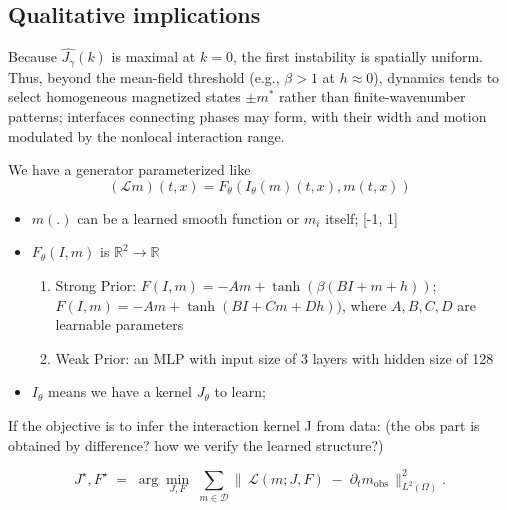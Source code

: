 \documentclass[11pt,a4paper]{article}
\begin{document}
\subsection{Qualitative implications}
Because $\widehat{J_\gamma}(k)$ is maximal at $k=0$, the first instability is spatially uniform. Thus, beyond the mean-field threshold (e.g., $\beta>1$ at $h\approx0$), dynamics tends to select homogeneous magnetized states $\pm m^*$ rather than finite-wavenumber patterns; interfaces connecting phases may form, with their width and motion modulated by the nonlocal interaction range.




We have a generator parameterized like
\begin{equation}
    (\mathcal{L}m)(t,x) = F_\theta(I_\theta (m)(t,x), m(t,x))
\end{equation}

\begin{itemize}
    \item $m(.)$ can be a learned smooth function or $m_i$ itself; [-1, 1]
    \item $F_\theta(I,m)$ is $\mathbb{R}^2 \to \mathbb{R}$
    \begin{enumerate}
        \item Strong Prior: $F(I, m)=-Am+\tanh(\beta(BI+m+h))$; $F(I, m)=-Am+\tanh(BI+Cm+Dh))$, where $A,B,C,D$ are learnable parameters
        \item Weak Prior: an MLP with input size of 3 layers with hidden size of 128
    \end{enumerate}
    \item $I_\theta$ means we have a kernel $J_\theta$ to learn;
\end{itemize}


If the objective is to infer the interaction kernel J from data: 
(the obs part is obtained by difference? how we verify the learned structure?)

\begin{equation}
    J^\star, F^\star \;=\; \arg\min_{J, F}\;
\sum_{m \in \mathcal{D}}
\bigl\|\, \mathcal{L}(m;J,F)\;-\;\partial_t m_{\mathrm{obs}} \,\bigr\|_{L^2(\Omega)}^{2}.
\end{equation}


\nocite{*}
\printbibliography
\end{document}
